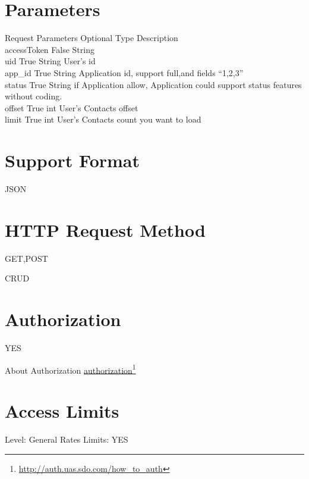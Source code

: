 \section{Parameters}
\label{parameters}

Request Parameters \textbar{} Optional \textbar{} Type \textbar{} Description\\
accessToken \textbar{} False \textbar{} String \textbar{}\\
uid \textbar{} True \textbar{} String \textbar{} User's id\\
app\_id \textbar{} True \textbar{} String \textbar{} Application id, support full,and fields ``1,2,3''\\
status \textbar{} True \textbar{} String \textbar{} if Application allow, Application could support status features without coding.\\
offset \textbar{} True \textbar{} int \textbar{} User's Contacts offset\\
limit \textbar{} True \textbar{} int \textbar{} User's Contacts count you want to load 

\section{Support Format}
\label{supportformat}

JSON

\section{HTTP Request Method}
\label{httprequestmethod}

GET,POST

CRUD

\section{Authorization}
\label{authorization}

YES

About Authorization \href{http://auth.uas.sdo.com/how_to_auth}{authorization}\footnote{\href{http://auth.uas.sdo.com/how_to_auth}{http:/\slash auth.uas.sdo.com\slash how\_to\_auth}}

\section{Access Limits}
\label{accesslimits}

Level: General
Rates Limits: YES

